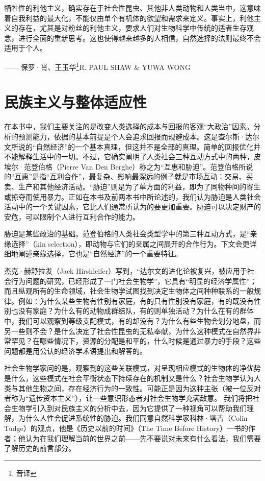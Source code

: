 \begin{tcolorbox}
\kaishu 牺牲性的利他主义，确实存在于社会性昆虫、其他非人类动物和人类当中，这意味着自我利益的最大化，不能仅由单个有机体的欲望和需求来定义。事实上，利他主义的存在，尤其是对粉丝的利他主义，要求人们对生物科学中传统的适者生存观念，进行全面的重新思考。这也使得越来越多的人相信，自然选择的法则最终不会适用于个人。
\begin{flushright}
—— 保罗·肖、王玉华\footnote{音译}R. PAUL SHAW \& YUWA WONG  
\end{flushright}
\end{tcolorbox}

\section{民族主义与整体适应性}

在本书中，我们主要关注的是改变人类选择的成本与回报的客观“大政治”因素。分析的预测能力，依据的基本前提是个人会追求回报而规避成本。这是查尔斯·达尔文所说的“自然经济”的一个基本真理，但这并不是全部的真理。简单的回报优化并不能解释生活中的一切。不过，它确实阐明了人类社会三种互动方式中的两种，皮埃尔·范登伯格（Pierre Van Den Berghe）称之为“互惠和胁迫”。范登伯格所说的“互惠”是指“互利合作”，最复杂、影响最深远的例子就是市场互动：交易、买卖、生产和其他经济活动。“胁迫”则是为了单方面的利益，即为了同物种间的寄生或掠夺而使用暴力。正如在本书及前两本书中所论述的，我们认为胁迫是人类社会活动中的一个关键因素，它比人们通常所认为的要更加重要。胁迫可以决定财产的安危，可以限制个人进行互利合作的能力。

胁迫是某些政治的基础。范登伯格的人类社会类型学中的第三种互动方式，是“亲缘选择”（kin selection），即动物与它们的亲属之间展开的合作行为。下文会更详细地阐述亲缘选择，它也是“自然经济”的一个重要特征。

杰克·赫舒拉发（Jack Hirshleifer）写到，“达尔文的进化论被复兴，被应用于社会行为问题的研究，已经形成了一门社会生物学”，它具有“明显的经济学属性”；而且纵观所有的生命领域，社会生物学试图找到决定生物体之间种种联系的一般规律。例如：为什么某些生物有性别有家庭，有的只有性别没有家庭，有的既没有性别也没有家庭？为什么有的动物成群结队，有的则单独活动？为什么在有的群体中，我们可以观察到等级支配模式，有的却没有？为什么有些生物会划分地盘，而另一些则不会？是什么决定了社会性昆虫的无私奉献，为什么这种模式在自然界非常罕见？在哪些情况下，资源的分配是和平的，什么时候是通过暴力的手段？这些问题都是用公认的经济学术语提出和解答的。

社会生物学家问的是，观察到的这些关联模式，对呈现相应模式的生物体的净优势是什么，这些模式在社会平衡状态下持续存在的机制又是什么？社会生物学认为人类与其他生物之间，存在经济行为的一致性。可能正是因为这种主张（被一位反对者称为“遗传资本主义”），让一些意识形态者对社会生物学充满敌意。 我们将把社会生物学引入到对民族主义的分析中去，因为它提供了一种视角可以帮助我们理解，为什么人性会促进系统性的胁迫。我们同意自然科学家科林·塔吉（Colin Tudge）的观点，他是《历史以前的时间》（The Time Before History）一书的作者；他认为在我们理解当前的世界之前——先不要说对未来有什么看法，我们需要了解历史的前言部分。

